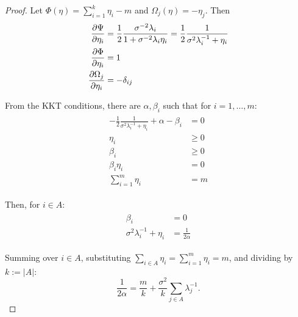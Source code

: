 \documentclass{article}
\begin{document}
\begin{proof}
  Let $\Phi(\eta) = \sum_{i=1}^k \eta_i - m$ and $\Omega_j(\eta) =
   -\eta_j$. Then
  \begin{align*}
    \begin{split}
      \frac{\partial \Psi}{\partial \eta_i}  &=
       \frac12 \frac{\sigma^{-2}\lambda_i}{1 + \sigma^{-2} \lambda_i\eta_i} = \frac12 \frac{1}{\sigma^{2}\lambda_i^{-1} + \eta_i} \\
      \frac{\partial\Phi}{\partial \eta_i} &= 1 \\
      \frac{\partial \Omega_j}{\partial \eta_i} &= -\delta_{ij}      
    \end{split}
  \end{align*}

  From the KKT conditions, there are $\alpha, \beta_i$ such that for $i=1,\dots,m$:
  \begin{align}
    \begin{split}
      -\frac12 \frac{1}{\sigma^{2}\lambda_i^{-1} + \eta_i} + \alpha - \beta_i  &= 0 \\
      \eta_i &\geq 0\\
      \beta_i &\geq 0\\
      \beta_i \eta_i &= 0\\
      \sum_{i=1}^m \eta_i &= m 
    \end{split}
  \end{align}

  Then, for $i \in A$:
  \begin{align*}
    \begin{split}
      \beta_i &= 0\\
      \sigma^{2}\lambda_i^{-1} + \eta_i  &= \frac{1}{2\alpha}%
    \end{split}
  \end{align*}
  
  Summing over $i \in A$, substituting $\sum_{i\in A} \eta_i =
  \sum_{i=1}^m \eta_i = m$, and dividing by $k:= |A|$:
  $$
  \frac{1}{2\alpha} = \frac{m}{k} + \frac{\sigma^2}{k} \sum_{j\in A} \lambda_j^{-1}.
  $$


\end{proof}
\end{document}
